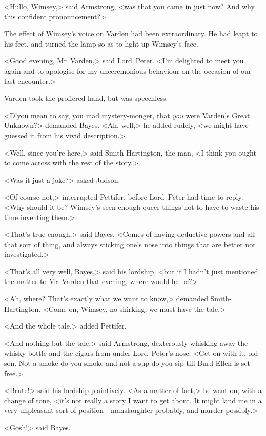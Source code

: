 <Hullo, Wimsey,> said Armstrong, <was that you came in just now? And why this confident pronouncement?>

The effect of Wimsey's voice on Varden had been extraordinary. He had leapt to his feet, and turned the lamp so as to light up Wimsey's face.

<Good evening, Mr~Varden,> said Lord~Peter. <I'm delighted to meet you again and to apologise for my unceremonious behaviour on the occasion of our last encounter.>

Varden took the proffered hand, but was speechless.

<D'you mean to say, you mad mystery-monger, that \emph{you} were Varden's Great Unknown?> demanded Bayes. <Ah, well,> he added rudely, <we might have guessed it from his vivid description.>

<Well, since you're here,> said Smith-Hartington, the  man, <I think you ought to come across with the rest of the story.>

<Was it just a joke?> asked Judson.

<Of course not,> interrupted Pettifer, before Lord~Peter had time to reply. <Why should it be? Wimsey's seen enough queer things not to have to waste his time inventing them.>

<That's true enough,> said Bayes. <Comes of having deductive powers and all that sort of thing, and always sticking one's nose into things that are better not investigated.>

<That's all very well, Bayes,> said his lordship, <but if I hadn't just mentioned the matter to Mr~Varden that evening, where would he be?>

<Ah, where? That's exactly what we want to know,> demanded Smith-Hartington. <Come on, Wimsey, no shirking; we must have the tale.>

<And the whole tale,> added Pettifer.

<And nothing but the tale,> said Armstrong, dexterously whisking away the whisky-bottle and the cigars from under Lord~Peter's nose. <Get on with it, old son. Not a smoke do you smoke and not a sup do you sip till Burd Ellen is set free.>

<Brute!> said his lordship plaintively. <As a matter of fact,> he went on, with a change of tone, <it's not really a story I want to get about. It might land me in a very unpleasant sort of position—manslaughter probably, and murder possibly.>

<Gosh!> said Bayes.

